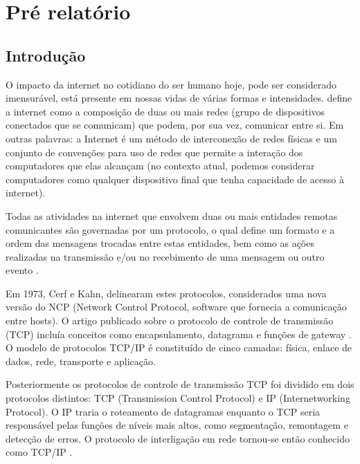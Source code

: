 
\chapter{Pré relatório}
\label{chap:pre-relatorio}



\section{Introdução}
\label{sec:antesleiame}

O impacto da internet no cotidiano do ser humano hoje, pode ser considerado imensurável, está presente em nossas vidas de várias formas e intensidades. \cite{Fourouzan} define a internet como a composição de duas ou mais redes (grupo de dispositivos conectados que se comunicam) que podem, por sua vez, comunicar entre si. Em outras palavras: a Internet é um método de interconexão de redes físicas e um conjunto de convenções para uso de redes que permite a interação dos computadores que elas alcançam \cite{Comer} (no contexto atual, podemos considerar computadores como qualquer dispositivo final que tenha capacidade de acesso à internet).

Todas as atividades na internet que envolvem duas ou mais entidades remotas comunicantes são governadas por um protocolo, o qual define um formato e a ordem das mensagens trocadas entre estas entidades, bem como as ações realizadas na transmissão e/ou no recebimento de uma mensagem ou outro evento \cite{Kurose}.

Em 1973, Cerf e Kahn, delinearam estes protocolos, considerados uma nova versão do NCP (Network Control Protocol, software que fornecia a comunicação entre hosts). O artigo publicado sobre o protocolo de controle de transmissão (TCP) incluía conceitos como encapsulamento, datagrama e funções de gateway \cite{Forouzan}. O modelo de protocolos TCP/IP é constituído de cinco camadas: física, enlace de dados, rede, transporte e aplicação. 

Posteriormente os protocolos de controle de transmissão TCP foi dividido em dois protocolos distintos: TCP (Transmission Control Protocol) e IP (Internetworking Protocol). O IP traria o roteamento de datagramas enquanto o TCP seria responsável pelas funções de níveis mais altos, como segmentação, remontagem e detecção de erros. O protocolo de interligação em rede tornou-se então conhecido como TCP/IP \cite{Forouzan}.

